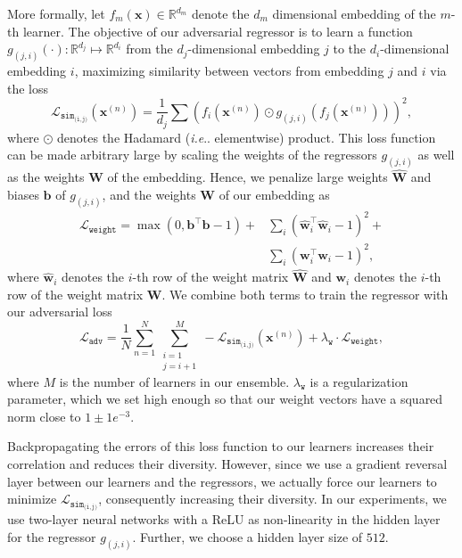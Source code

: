 \documentclass[10pt,journal,compsoc]{IEEEtran}
\makeatletter
\DeclareRobustCommand\onedot{\futurelet\@let@token\@onedot}
\def\@onedot{\ifx\@let@token.\else.\null\fi\xspace}
\def\ie{\emph{i.e}\onedot} \def\Ie{\emph{I.e}\onedot}
\makeatother
\begin{document}
More formally, let $f_m(\boldsymbol{x}) \in \mathbb{R}^{d_m}$
denote the $d_m$ dimensional embedding of the $m$-th learner. The objective of our adversarial 
regressor is to learn a function $g_{(j,i)}(\cdot): \mathbb{R}^{d_j} \mapsto \mathbb{R}^{d_i}$ from the $d_j$-dimensional embedding $j$ to the $d_i$-dimensional embedding $i$, maximizing 
similarity between vectors from embedding $j$ and $i$ via the loss
\begin{equation}
    \mathcal{L}_{\texttt{sim}_\texttt{(i,j)}}(\boldsymbol{x}^{(n)}) =  \frac{1}{d_j} \sum (f_i(\boldsymbol{x}^{(n)}) \odot g_{\left(j,i\right)}(f_j(\boldsymbol{x}^{(n)}))) ^ 2,
\end{equation}
where $\odot$ denotes the Hadamard (\ie elementwise) product.
This loss function can be made arbitrary large by scaling the weights of the regressors $g_{\left(j,i\right)}$ as well as the weights $\boldsymbol{W}$ of the embedding.
Hence, we penalize large weights $\boldsymbol{\widehat{W}}$ and biases $\boldsymbol{b}$ of $g_{\left(j,i\right)}$, and the weights $\boldsymbol{W}$ of our embedding as
\begin{align}
    \label{eq:weight-adv}
    \mathcal{L}_{\texttt{weight}} = \max(0, \boldsymbol{b}^\top \boldsymbol{b} - 1) +& \sum_i (\boldsymbol{\widehat{w}}_i^{\top} \boldsymbol{\widehat{w}}_i - 1) ^ 2 + \nonumber \\
                                    & \sum_i (\boldsymbol{w}_i^{\top} \boldsymbol{w}_i - 1)^2,
\end{align}
where $\boldsymbol{\widehat{w}}_i$ denotes the $i$-th row of the weight matrix $\boldsymbol{\widehat{W}}$ and $\boldsymbol{w}_i$ denotes the $i$-th row of the weight matrix $\boldsymbol{W}$.
We combine both terms to train the regressor with our adversarial loss
\begin{equation}
    \label{eq:adv}
    \mathcal{L}_{\texttt{adv}} = \frac{1}{N} \sum_{n=1}^N \sum_{\substack{i = 1 \\ j = i + 1}}^M -\mathcal{L}_{\texttt{sim}_\texttt{(i,j)}}(\boldsymbol{x}^{(n)}) + \lambda_{\texttt{w}} \cdot \mathcal{L}_{\texttt{weight}},
\end{equation}
where $M$ is the number of learners in our ensemble. $\lambda_{\texttt{w}}$ is a regularization parameter, which we set high enough 
so that our weight vectors have a squared norm close to ${1 \pm 1e^{-3}}$.

Backpropagating the errors of this loss function to our learners increases
their correlation and reduces their diversity. However, since we use a gradient
reversal layer between our learners and the regressors, we actually force our learners
to minimize $\mathcal{L}_{\texttt{sim}_\texttt{(i,j)}}$, consequently increasing
their diversity.  In our experiments, we use two-layer neural networks with a
\ac{ReLU} as non-linearity in the hidden layer for the regressor $g_{\left(j, i\right)}$. Further, we choose a 
hidden layer size of $512$.
\end{document}
